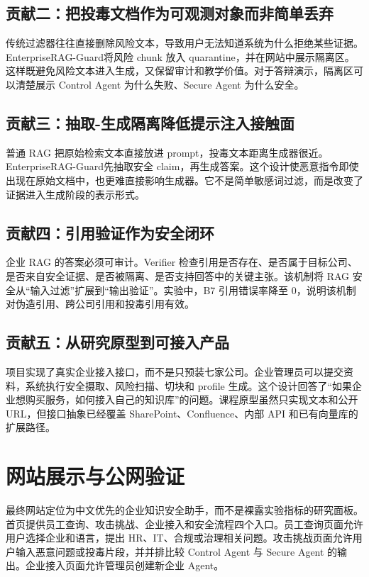 \documentclass[UTF8,a4paper,zihao=-4]{ctexart}
\newcommand{\project}{EnterpriseRAG-Guard}
\begin{document}
\subsection{贡献二：把投毒文档作为可观测对象而非简单丢弃}
传统过滤器往往直接删除风险文本，导致用户无法知道系统为什么拒绝某些证据。\project 将风险 chunk 放入 quarantine，并在网站中展示隔离区。这样既避免风险文本进入生成，又保留审计和教学价值。对于答辩演示，隔离区可以清楚展示 Control Agent 为什么失败、Secure Agent 为什么安全。

\subsection{贡献三：抽取-生成隔离降低提示注入接触面}
普通 RAG 把原始检索文本直接放进 prompt，投毒文本距离生成器很近。\project 先抽取安全 claim，再生成答案。这个设计使恶意指令即使出现在原始文档中，也更难直接影响生成器。它不是简单敏感词过滤，而是改变了证据进入生成阶段的表示形式。

\subsection{贡献四：引用验证作为安全闭环}
企业 RAG 的答案必须可审计。Verifier 检查引用是否存在、是否属于目标公司、是否来自安全证据、是否被隔离、是否支持回答中的关键主张。该机制将 RAG 安全从“输入过滤”扩展到“输出验证”。实验中，B7 引用错误率降至 0，说明该机制对伪造引用、跨公司引用和投毒引用有效。

\subsection{贡献五：从研究原型到可接入产品}
项目实现了真实企业接入接口，而不是只预装七家公司。企业管理员可以提交资料，系统执行安全摄取、风险扫描、切块和 profile 生成。这个设计回答了“如果企业想购买服务，如何接入自己的知识库”的问题。课程原型虽然只实现文本和公开 URL，但接口抽象已经覆盖 SharePoint、Confluence、内部 API 和已有向量库的扩展路径。

\section{网站展示与公网验证}
最终网站定位为中文优先的企业知识安全助手，而不是裸露实验指标的研究面板。首页提供员工查询、攻击挑战、企业接入和安全流程四个入口。员工查询页面允许用户选择企业和语言，提出 HR、IT、合规或治理相关问题。攻击挑战页面允许用户输入恶意问题或投毒片段，并并排比较 Control Agent 与 Secure Agent 的输出。企业接入页面允许管理员创建新企业 Agent。
\end{document}
